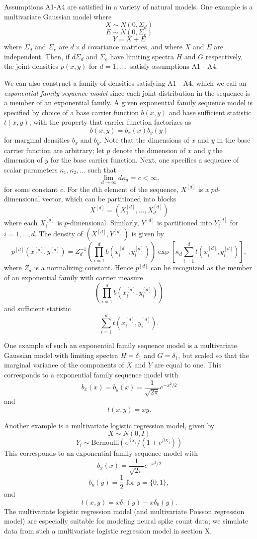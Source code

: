 \documentclass[12pt]{article}
\begin{document}
Assumptions A1-A4 are satisfied in a variety of natural models.
One example is a multivariate Gaussian model where
\[
X \sim N(0, \Sigma_d)
\]
\[
E \sim N(0, \Sigma_e)
\]
\[
Y = X + E
\]
where $\Sigma_d$ and $\Sigma_e$ are $d \times d$ covariance matrices, and where $X$ and $E$ are independent.  Then, if $d \Sigma_d$ and $\Sigma_e$ have limiting spectra $H$ and $G$ respectively,
the joint densities $p(x, y)$ for $d = 1,\hdots, $ satisfy assumptions A1 - A4.

We can also construct a family of densities satisfying A1 - A4,
which we call an \emph{exponential family sequence model} since each joint distribution in the sequence
is a member of an exponential family.
A given exponential family sequence model is specified by choice of a base carrier function $b(x, y)$ and base sufficient statistic $t(x, y)$, with the property that carrier function factorizes as
\[
b(x, y) = b_x(x) b_y(y)
\]
for marginal densities $b_x$ and $b_y$.
Note that the dimensions of $x$ and $y$ in the base carrier function are arbitrary;
let $p$ denote the dimension of $x$ and $q$ the dimension of $y$ for the base carrier function.
Next, one specifies a sequence of scalar parameters $\kappa_1, \kappa_2,\hdots$ such that
\[
\lim_{d \to \infty} d \kappa_d = c < \infty.
\]
for some constant $c$.
For the $d$th element of the sequence, $X^{[d]}$ is a $pd$-dimensional vector,
which can be partitioned into blocks
\[
X^{[d]} = (X_1^{[d]},\hdots, X_d^{[d]})
\]
where each $X_i^{[d]}$ is $p$-dimensional.  Similarly, $Y^{[d]}$ is partitioned into $Y_i^{[d]}$ for $i = 1,\hdots, d$.
The density of $(X^{[d]}, Y^{[d]})$ is given by
\[
p^{[d]}(x^{[d]}, y^{[d]}) = Z_d^{-1} \left(\prod_{i=1}^d b(x_i^{[d]}, y_i^{[d]}) \right) 
\exp\left[\kappa_d \sum_{i=1}^d t(x_i^{[d]}, y_i^{[d]}) \right],
\]
where $Z_d$ is a normalizing constant.
Hence $p^{[d]}$ can be recognized as the member of an exponential family with carrier measure
\[
\left(\prod_{i=1}^d b(x_i^{[d]}, y_i^{[d]}) \right)
\]
and sufficient statistic
\[
\sum_{i=1}^d t(x_i^{[d]}, y_i^{[d]}).
\]

One example of such an exponential family sequence model is a multivariate Gaussian model with limiting spectra $H = \delta_1$ and $G = \delta_1$, but scaled so that the marginal variance of the components of $X$ and $Y$ are equal to one.  This corresponds to a exponential family sequence model with
\[
b_x(x) = b_y(x) = \frac{1}{\sqrt{2\pi}} e^{-x^2/2}
\]
and
\[t(x, y) = xy.\]

Another example is a multivariate logistic regression model,
given by
\[
X \sim N(0, I)
\]
\[
Y_i \sim \text{Bernoulli}(e^{\beta X_i}/(1 + e^{\beta X_i}))
\]
This corresponds to an exponential family sequence model with
\[
b_x(x) = \frac{1}{\sqrt{2\pi}} e^{-x^2/2}
\]
\[
b_y(y) = \frac{1}{2}\text{ for }y = \{0, 1\},
\]
and
\[
t(x, y) = x\delta_1(y) - x\delta_0(y).
\]
The multivariate logistic regression model (and multivariate Poisson regression model)
are especially suitable for modeling neural spike count data;
we simulate data from such a multivariate logistic regression model in section X.
\end{document}

